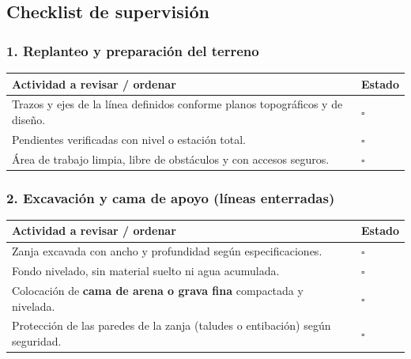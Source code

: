 \documentclass[12pt]{article}
\newcommand{\cbox}{\(\square\)}
\renewcommand{\cbox}{\(\square\)} %
\begin{document}
	\subsection{Checklist de supervisión}
	
	\subsubsection*{1. Replanteo y preparación del terreno}
	\begin{tabularx}{\linewidth}{>{\raggedright\arraybackslash}p{0.93\linewidth} >{\centering\arraybackslash}m{0.07\linewidth}}
		\toprule
		\textbf{Actividad a revisar / ordenar} & \textbf{Estado}\\
		\midrule
		Trazos y ejes de la línea definidos conforme planos topográficos y de diseño. & \cbox \\
		Pendientes verificadas con nivel o estación total. & \cbox \\
		Área de trabajo limpia, libre de obstáculos y con accesos seguros. & \cbox \\
		\bottomrule
	\end{tabularx}
	
	\subsubsection*{2. Excavación y cama de apoyo (líneas enterradas)}
	\begin{tabularx}{\linewidth}{>{\raggedright\arraybackslash}p{0.93\linewidth} >{\centering\arraybackslash}m{0.07\linewidth}}
		\toprule
		\textbf{Actividad a revisar / ordenar} & \textbf{Estado}\\
		\midrule
		Zanja excavada con ancho y profundidad según especificaciones. & \cbox \\
		Fondo nivelado, sin material suelto ni agua acumulada. & \cbox \\
		Colocación de \textbf{cama de arena o grava fina} compactada y nivelada. & \cbox \\
		Protección de las paredes de la zanja (taludes o entibación) según seguridad. & \cbox \\
		\bottomrule
	\end{tabularx}
	
\end{document}
